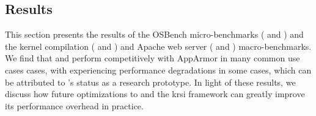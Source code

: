 




\subsection{Results}%
\label{ss:eval-results}

This section presents the results of the OSBench micro-benchmarks ( and
) and the kernel
compilation ( and ) and
Apache web server ( and )
macro-benchmarks. We find that \bpfbox{} and \bpfcontain{} perform competitively with
AppArmor in many common use cases cases, with \bpfcontain{} experiencing performance
degradations in some cases, which can be attributed to \bpfcontain{}'s status as
a research prototype. In light of these results, we discuss how future optimizations to
\bpfcontain{} and the \gls{krsi} framework can greatly improve its performance overhead in
practice.

